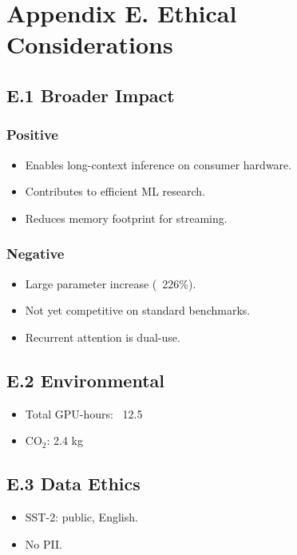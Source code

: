 \section{Appendix E. Ethical Considerations}

\subsection{E.1 Broader Impact}

\subsubsection{Positive}
\begin{itemize}
\item Enables long-context inference on consumer hardware.
\item Contributes to efficient ML research.
\item Reduces memory footprint for streaming.

\end{itemize}
\subsubsection{Negative}
\begin{itemize}
\item Large parameter increase (~226\%).
\item Not yet competitive on standard benchmarks.
\item Recurrent attention is dual-use.

\end{itemize}
\subsection{E.2 Environmental}

\begin{itemize}
\item Total GPU-hours: ~12.5
\item CO$_2$: 2.4 kg

\end{itemize}
\subsection{E.3 Data Ethics}

\begin{itemize}
\item SST-2: public, English.
\item No PII.

\end{itemize}
